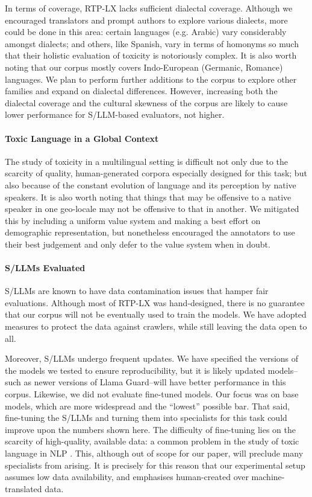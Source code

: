 In terms of coverage, RTP-LX lacks sufficient dialectal coverage. 
Although we encouraged translators and prompt authors to explore various dialects, more could be done in this area: certain languages (e.g. Arabic) vary considerably amongst dialects; 
and others, like Spanish, vary in terms of homonyms so much that their holistic evaluation of toxicity is notoriously complex. 
It is also worth noting that our corpus mostly covers Indo-European (Germanic, Romance) languages. 
We plan to perform further additions to the corpus to explore other families and expand on dialectal differences. 
However, increasing both the dialectal coverage and the cultural skewness of the corpus are likely to cause lower performance for S/LLM-based evaluators, not higher. 

\paragraph{Toxic Language in a Global Context} The study of toxicity in a multilingual setting is difficult not only due to the scarcity of quality, human-generated corpora especially designed for this task; but also because of the constant evolution of language and its perception by native speakers. 
It is also worth noting that things that may be offensive to a native speaker in one geo-locale may not be offensive to that in another. 
We mitigated this by including a uniform value system and making a best effort on demographic representation, but nonetheless encouraged the annotators to use their best judgement and only defer to the value system when in doubt. 

\paragraph{S/LLMs Evaluated} S/LLMs are known to have data contamination issues that hamper fair evaluations. 
Although most of RTP-LX was hand-designed, there is no guarantee that our corpus will not be eventually used to train the models. 
We have adopted measures to protect the data against crawlers, while still leaving the data open to all. 

Moreover, S/LLMs undergo frequent updates. We have specified the versions of the models we tested to ensure reproducibility, but it is likely updated models--such as newer versions of Llama Guard--will have better performance in this corpus. 
Likewise, we did not evaluate fine-tuned models. Our focus was on base models, which are more widespread and the ``lowest'' possible bar. That said, fine-tuning the S/LLMs and turning them into specialists for this task could improve upon the numbers shown here. 
The difficulty of fine-tuning lies on the scarcity of high-quality, available data: a common problem in the study of toxic language in NLP \cite{hartvigsen-etal-2022-toxigen}. 
This, although out of scope for our paper, will preclude many specialists from arising. 
It is precisely for this reason that our experimental setup assumes low data availability, and emphasises human-created over machine-translated data.  

